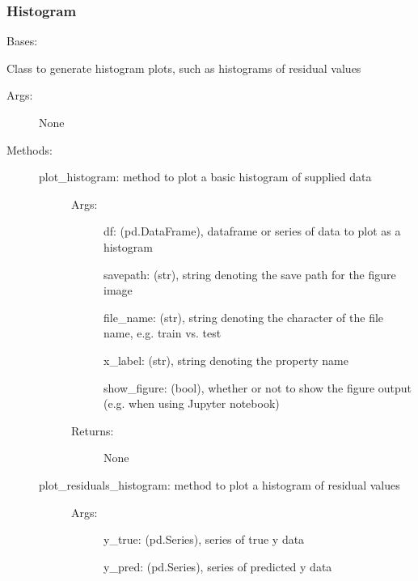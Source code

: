 \documentclass[letterpaper,10pt,english]{sphinxmanual}
\begin{document}
\subsubsection{Histogram}
\label{\detokenize{api/mastml.plots.Histogram:histogram}}\label{\detokenize{api/mastml.plots.Histogram::doc}}

\begin{fulllineitems}
\label{\detokenize{api/mastml.plots.Histogram:mastml.plots.Histogram}}
Bases: 

Class to generate histogram plots, such as histograms of residual values
\begin{description}
\item[{Args:}] \leavevmode
None

\item[{Methods:}] \leavevmode\begin{description}
\item[{plot\_histogram: method to plot a basic histogram of supplied data}] \leavevmode\begin{description}
\item[{Args:}] \leavevmode
df: (pd.DataFrame), dataframe or series of data to plot as a histogram

savepath: (str), string denoting the save path for the figure image

file\_name: (str), string denoting the character of the file name, e.g. train vs. test

x\_label: (str), string denoting the  property name

show\_figure: (bool), whether or not to show the figure output (e.g. when using Jupyter notebook)

\item[{Returns:}] \leavevmode
None

\end{description}

\item[{plot\_residuals\_histogram: method to plot a histogram of residual values}] \leavevmode\begin{description}
\item[{Args:}] \leavevmode
y\_true: (pd.Series), series of true y data

y\_pred: (pd.Series), series of predicted y data


\end{description}
\end{description}
\end{description}
\end{fulllineitems}
\end{document}
